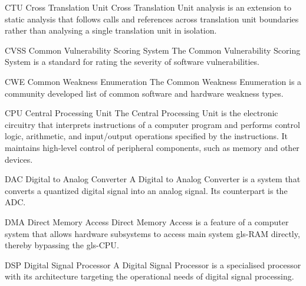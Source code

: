 %
  {CTU}%
  {Cross Translation Unit}%
  {Cross Translation Unit analysis is an extension to static analysis that %
   follows calls and references across translation unit boundaries rather than %
   analysing a single translation unit in isolation.}%

%
  {CVSS}%
  {Common Vulnerability Scoring System}%
  {The Common Vulnerability Scoring System is a standard for rating the %
   severity of software vulnerabilities.}%

%
  {CWE}%
  {Common Weakness Enumeration}%
  {The Common Weakness Enumeration is a community developed list of common %
   software and hardware weakness types.}%

%
  {CPU}%
  {Central Processing Unit}%
  {The Central Processing Unit is the electronic circuitry that interprets
  instructions of a computer program and performs control logic, arithmetic,
  and input/output operations specified by the instructions. It maintains
  high-level control of peripheral components, such as memory and other devices.}%

%
  {DAC}%
  {Digital to Analog Converter}%
  {A Digital to Analog Converter is a system that converts a quantized digital
   signal into an analog signal. Its counterpart is the \gls{ADC}.}%

%
  {DMA}%
  {Direct Memory Access}%
  {Direct Memory Access is a feature of a computer system that allows hardware
   subsystems to access main system \gls{gls-RAM} directly, thereby bypassing
   the \gls{gls-CPU}.}%








%
  {DSP}%
  {Digital Signal Processor}%
  {A Digital Signal Processor is a specialised processor with its architecture %
   targeting the operational needs of digital signal processing.}%

